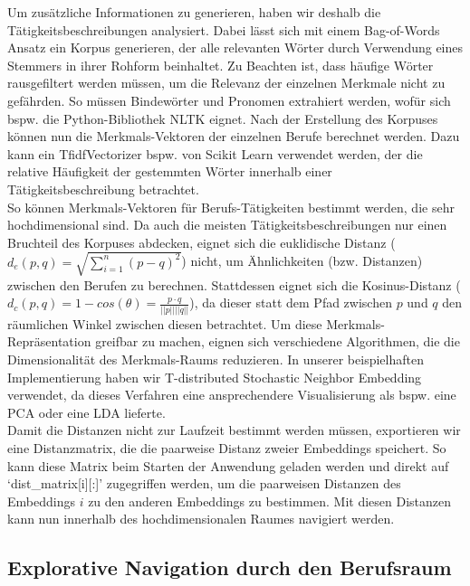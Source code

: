 \documentclass[10pt]{article}
\begin{document}
Um zusätzliche Informationen zu generieren, haben wir deshalb die
Tätigkeitsbeschreibungen analysiert. Dabei lässt sich mit einem Bag-of-Words
Ansatz ein Korpus generieren, der alle relevanten Wörter durch Verwendung eines
Stemmers in ihrer Rohform beinhaltet. Zu Beachten ist, dass häufige Wörter
rausgefiltert werden müssen, um die Relevanz der einzelnen Merkmale nicht zu
gefährden. So müssen Bindewörter und Pronomen extrahiert werden, wofür sich
bspw. die Python-Bibliothek NLTK eignet. Nach der Erstellung des Korpuses 
können nun die Merkmals-Vektoren der einzelnen Berufe berechnet werden.
Dazu kann ein TfidfVectorizer bspw. von Scikit Learn verwendet werden, der die
relative Häufigkeit der gestemmten Wörter innerhalb einer Tätigkeitsbeschreibung
betrachtet.\\

So können Merkmals-Vektoren für Berufs-Tätigkeiten bestimmt werden, die sehr
hochdimensional sind. Da auch die meisten Tätigkeitsbeschreibungen nur einen
Bruchteil des Korpuses abdecken, eignet sich die euklidische Distanz ($d_e(p,q)
= \sqrt{\sum_{i=1}^n (p-q)^2}$) nicht, um Ähnlichkeiten (bzw. Distanzen)
zwischen den Berufen zu berechnen. Stattdessen eignet sich die Kosinus-Distanz
($d_c(p,q) = 1 - cos(\theta) = \frac{p \cdot q}{||p|| ||q||}$), da dieser statt
dem Pfad zwischen $p$ und $q$ den räumlichen Winkel zwischen diesen betrachtet.
Um diese Merkmals-Repräsentation greifbar zu machen, eignen sich verschiedene
Algorithmen, die die Dimensionalität des Merkmals-Raums reduzieren. In unserer
beispielhaften Implementierung haben wir T-distributed Stochastic Neighbor
Embedding verwendet, da dieses Verfahren eine ansprechendere Visualisierung als
bspw. eine PCA oder eine LDA lieferte.\\

Damit die Distanzen nicht zur Laufzeit bestimmt werden müssen, exportieren wir
eine Distanzmatrix, die die paarweise Distanz zweier Embeddings speichert. So
kann diese Matrix beim Starten der Anwendung geladen werden und direkt auf
`dist\_matrix[i][:]' zugegriffen werden, um die paarweisen Distanzen des
Embeddings $i$ zu den anderen Embeddings zu bestimmen. Mit diesen Distanzen kann
nun innerhalb des hochdimensionalen Raumes navigiert werden.

\subsection{Explorative Navigation durch den Berufsraum}
\end{document}

